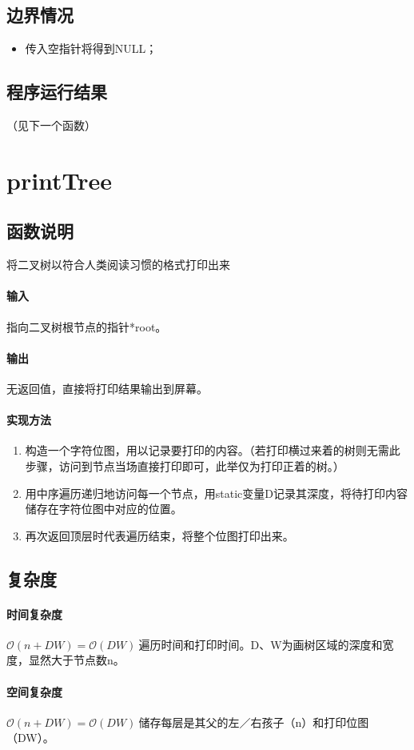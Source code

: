 \documentclass{homework}
\begin{document}
\subsection{边界情况}
\begin{itemize}
    \item 传入空指针将得到NULL；
\end{itemize}
\subsection{程序运行结果}
（见下一个函数）
\section{printTree}
\subsection{函数说明}
将二叉树以符合人类阅读习惯的格式打印出来
\paragraph{输入}
指向二叉树根节点的指针*root。
\paragraph{输出}
无返回值，直接将打印结果输出到屏幕。
\paragraph{实现方法}
\begin{enumerate}
    \item 构造一个字符位图，用以记录要打印的内容。（若打印横过来着的树则无需此步骤，访问到节点当场直接打印即可，此举仅为打印正着的树。）
    \item 用中序遍历递归地访问每一个节点，用static变量D记录其深度，将待打印内容储存在字符位图中对应的位置。
    \item 再次返回顶层时代表遍历结束，将整个位图打印出来。
\end{enumerate}
\subsection{复杂度}
\paragraph{时间复杂度}
$\mathcal{O}(n+DW)=\mathcal{O}(DW)~$遍历时间和打印时间。D、W为画树区域的深度和宽度，显然大于节点数n。
\paragraph{空间复杂度}
$\mathcal{O}(n+DW)=\mathcal{O}(DW)~$储存每层是其父的左／右孩子（n）和打印位图（DW）。
\end{document}
